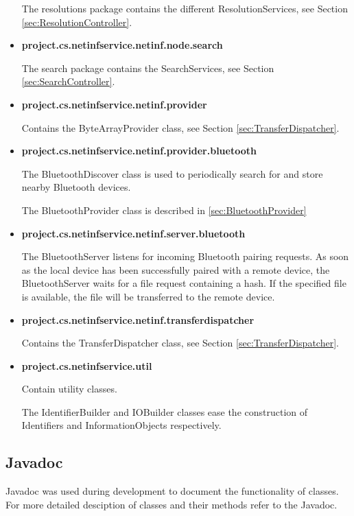\begin{itemize}
	The resolutions package contains the different ResolutionServices, see Section \ref{sec:ResolutionController}.
	
	\item{\bf project.cs.netinfservice.netinf.node.search}
	
	The search package contains the SearchServices, see Section \ref{sec:SearchController}.
	
	\item{\bf project.cs.netinfservice.netinf.provider}
	
	Contains the ByteArrayProvider class, see Section \ref{sec:TransferDispatcher}.
	
	\item{\bf project.cs.netinfservice.netinf.provider.bluetooth}
	
	The BluetoothDiscover class is used to periodically search for and store nearby Bluetooth devices.
	
	The BluetoothProvider class is described in \ref{sec:BluetoothProvider}
	
	\item{\bf project.cs.netinfservice.netinf.server.bluetooth}
	
	The BluetoothServer listens for incoming Bluetooth pairing requests. As soon as the local device has been successfully paired with a remote device, the BluetoothServer waits for a file request containing a hash. If the specified file is available, the file will be transferred to the remote device.
	
	\item{\bf project.cs.netinfservice.netinf.transferdispatcher}
	
	Contains the TransferDispatcher class, see Section \ref{sec:TransferDispatcher}.
	
	\item{\bf project.cs.netinfservice.util}

	Contain utility classes.
	
	The IdentifierBuilder and IOBuilder classes ease the construction of Identifiers and InformationObjects respectively.
	
\end{itemize}

\subsection{Javadoc}

Javadoc was used during development to document the functionality of classes. For more detailed desciption of classes and their methods refer to the Javadoc.